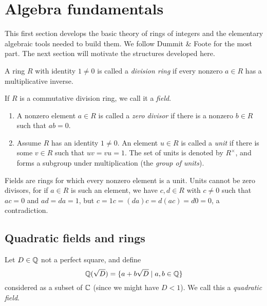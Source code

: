 \section{Algebra fundamentals}

This first section develops the basic theory of rings of integers and the elementary algebraic tools needed to build them. We follow Dummit \& Foote for the most part. The next section will motivate the structures developed here.

\begin{definition}[D\&F pp. 224]
	A ring $R$ with identity $1\neq 0$ is called a \emph{division ring} if every nonzero $a\in R$ has a multiplicative inverse.

	If $R$ is a commutative division ring, we call it a \emph{field}.
\end{definition}

\begin{definition}
	\begin{enumerate}
		\item A nonzero element $a\in R$ is called a \emph{zero divisor} if there is a nonzero $b\in R$ such that $ab=0$.
		\item Assume $R$ has an identity $1\neq 0$. An element $u\in R$ is called a \emph{unit} if there is some $v\in R$ such that $uv=vu=1$. The set of units is denoted by $R^\times$, and forms a subgroup under multiplication (the \emph{group of units}).
	\end{enumerate}
\end{definition}

Fields are rings for which every nonzero element is a unit. Units cannot be zero divisors, for if $a\in R$ is such an element, we have $c,d\in R$ with $c\neq 0$ such that $ac=0$ and $ad=da=1$, but $c=1c=(da)c=d(ac)=d0=0$, a contradiction.



\subsection{Quadratic fields and rings}

\begin{definition}
	Let $D\in\mathbb{Q}$ not a perfect square, and define
	\[
		\mathbb{Q}(\sqrt{D}) = \{a+b\sqrt{D} \mid a,b\in\mathbb{Q}\}
	\]
	considered as a subset of $\mathbb{C}$ (since we might have $D<1$). We call this a \emph{quadratic field}.
\end{definition}

